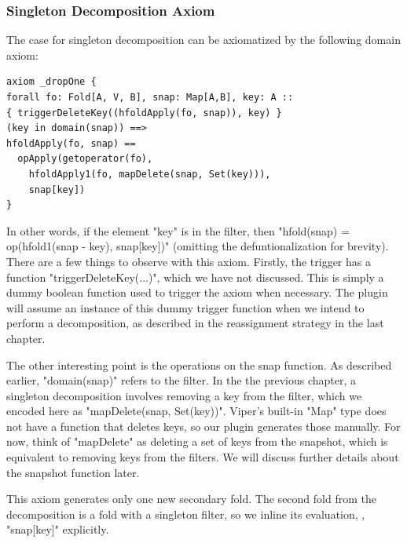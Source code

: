\documentclass[msc,oneside]{ubcthesis}
\theoremstyle{definition}
\begin{document}
\subsubsection{Singleton Decomposition Axiom}
The case for singleton decomposition can be axiomatized by the following domain axiom:
\begin{lstlisting}[label=axm:drpone,caption=Decomposition By Removing 1 Element]
axiom _dropOne {
forall fo: Fold[A, V, B], snap: Map[A,B], key: A ::
{ triggerDeleteKey((hfoldApply(fo, snap)), key) }
(key in domain(snap)) ==>
hfoldApply(fo, snap) == 
  opApply(getoperator(fo), 
    hfoldApply1(fo, mapDelete(snap, Set(key))), 
    snap[key])
}
\end{lstlisting}
In other words, if the element "key" is in the filter, then "hfold(snap) = op(hfold1(snap - key), snap[key])" (omitting the defuntionalization for brevity). There are a few things to observe with this axiom. Firstly, the trigger has a function "triggerDeleteKey(...)", which we have not discussed. This is simply a dummy boolean function used to trigger the axiom when necessary. The plugin will assume an instance of this dummy trigger function when we intend to perform a decomposition, as described in the reassignment strategy in the last chapter.

The other interesting point is the operations on the snap function. As described earlier, "domain(snap)" refers to the filter. In the the previous chapter, a singleton decomposition involves removing a key from the filter, which we encoded here as "mapDelete(snap, Set(key))". Viper's built-in "Map" type does not have a function that deletes keys, so our plugin generates those manually. For now, think of "mapDelete" as deleting a set of keys from the snapshot, which is equivalent to removing keys from the filters. We will discuss further details about the snapshot function later.

This axiom generates only one new secondary fold. The second fold from the decomposition is a fold with a singleton filter, so we inline its evaluation, \ie, "snap[key]" explicitly.
\end{document}
